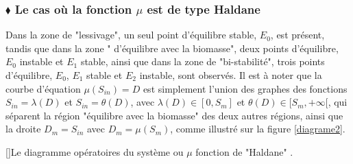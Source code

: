\documentclass[12pt,a4paper]{report}%
\begin{document}
\subsubsection{$\blacklozenge$ Le cas où la fonction $\mu$ est de type Haldane}
Dans la zone de "lessivage", un seul point d'équilibre stable, $E_0$, est présent, tandis que dans la zone " d'équilibre avec la biomasse", deux points d'équilibre, $E_0$ instable et $E_1$ stable, ainsi que dans la zone de "bi-stabilité", trois points d'équilibre, $E_0$, $E_1$ stable et $E_2$ instable, sont observés. Il est à noter que la courbe d'équation $\mu(S_{in}) = D$ est simplement l'union des graphes des fonctions $S_{in} = \lambda(D)$ et $S_{in} = \theta(D)$, avec $\lambda(D) \in [0, S_m]$ et $\theta(D) \in [S_m, +\infty[$, qui séparent la région "équilibre avec la biomasse" des deux autres régions, ainsi que la droite $D_m = S_{in}$ avec $D_m = \mu(S_m)$, comme illustré sur la figure \ref{diagrame2}.
\begin{center}
  []{Le diagramme opératoires du système ou $\mu$ fonction de "Haldane" .}
  \label{diagrame2}
\end{center}
\end{document}
